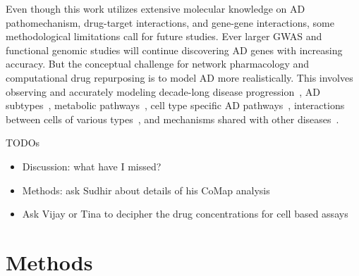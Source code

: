 \documentclass[letterpaper]{article}
\begin{document}

Even though this work utilizes extensive molecular knowledge on AD
pathomechanism, drug-target interactions, and gene-gene interactions, some
methodological limitations call for future studies.  Ever larger GWAS and
functional genomic studies will continue discovering AD genes with increasing
accuracy.  But the conceptual challenge for network pharmacology and
computational drug repurposing is to model AD more realistically.  This
involves observing and accurately modeling decade-long disease
progression~\cite{Kuo2022,IturriaMedina2022}, AD
subtypes~\citep{Neff2021}, metabolic pathways~\cite{Varma2021a}, cell type
specific AD pathways~\citep{Mathys2019,Neff2021}, interactions between cells
of various types~\citep{DeStrooper2016}, and mechanisms shared with other
diseases~\citep{Consortium2018,Santiago2021}.

TODOs
\begin{itemize}
  \item Discussion: what have I missed?
  \item Methods: ask Sudhir about details of his CoMap analysis
  \item Ask Vijay or Tina to decipher the drug concentrations for cell based
    assays
\end{itemize}

\section{Methods}
\end{document}

